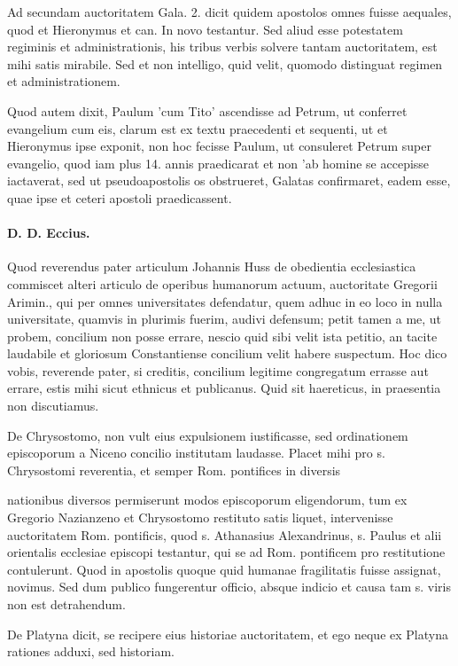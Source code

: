 \marginpar{\small[311]} Ad secundam auctoritatem Gala. 2. dicit quidem apostolos omnes fuisse aequales, quod et Hieronymus et can. In novo testantur. Sed aliud esse potestatem regiminis et administrationis, his tribus verbis solvere tantam auctoritatem, est mihi satis mirabile. Sed et non intelligo, quid velit, quomodo distinguat regimen et administrationem.

Quod autem dixit, Paulum 'cum Tito' ascendisse ad Petrum, ut conferret evangelium cum eis, clarum est ex textu praecedenti et sequenti, ut et Hieronymus ipse exponit, non hoc fecisse Paulum, ut consuleret Petrum super evangelio, quod iam plus 14. annis praedicarat et non 'ab homine se accepisse iactaverat, sed ut pseudoapostolis os obstrueret, Galatas confirmaret, eadem esse, quae ipse et ceteri apostoli praedicassent.

\paragraph*{D. D. Eccius.}

Quod reverendus pater articulum Johannis Huss de obedientia ecclesiastica commiscet alteri articulo de operibus humanorum actuum, auctoritate Gregorii Arimin., qui per omnes universitates defendatur, quem adhuc in eo loco in nulla universitate, quamvis in plurimis fuerim, audivi defensum; petit tamen a me, ut probem, concilium non posse errare, nescio quid sibi velit ista petitio, an tacite laudabile et gloriosum Constantiense concilium velit habere suspectum. Hoc dico vobis, reverende pater, si creditis, concilium legitime congregatum errasse aut errare, estis mihi sicut ethnicus et publicanus. Quid sit haereticus, in praesentia non discutiamus.

De Chrysostomo, non vult eius expulsionem iustificasse, sed ordinationem episcoporum a Niceno concilio institutam laudasse. Placet mihi pro s. Chrysostomi reverentia, et semper Rom. pontifices in diversis

nationibus diversos permiserunt modos episcoporum eligendorum, tum ex Gregorio Nazianzeno et Chrysostomo restituto satis liquet, intervenisse auctoritatem Rom. pontificis, quod s. Athanasius Alexandrinus, s. Paulus et alii orientalis ecclesiae episcopi testantur, qui se ad Rom. pontificem pro restitutione contulerunt. Quod in apostolis quoque quid humanae fragilitatis fuisse assignat, novimus. Sed dum publico fungerentur officio, absque indicio et causa tam s. viris non est detrahendum.

De Platyna dicit, se recipere eius historiae auctoritatem, et ego neque ex Platyna rationes adduxi, sed historiam.

